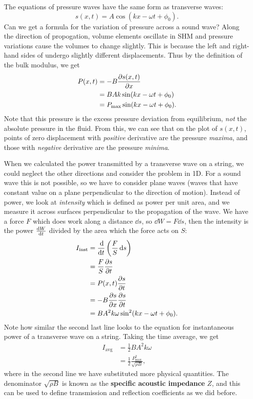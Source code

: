 \documentclass[../classical_mechanics.tex]{subfiles}
\begin{document}
        The equations of pressure waves have the same form as transverse waves:
        \begin{equation}
            s(x,t)=A\cos(kx-\omega t+\phi_0).
        \end{equation}
        Can we get a formula for the variation of pressure across a sound wave?
        Along the direction of propogation, volume elements oscillate in SHM and pressure variations cause the volumes to change slightly.
        This is because the left and right-hand sides of undergo slightly different displacements.
        Thus by the definition of the bulk modulus, we get
        \begin{align}
            P(x,t)&=-B\pdv{s(x,t)}{x}\\
            &=BAk\sin(kx-\omega t+\phi_0)\\
            &=P_\text{max}\sin(kx-\omega t+\phi_0).
        \end{align}
        Note that this pressure is the excess pressure deviation from equilibrium, \textit{not} the absolute pressure in the fluid.
        From this, we can see that on the plot of $s(x,t)$, points of zero displacement with \textit{positive} derivative are the pressure \textit{maxima}, and those with \textit{negative} derivative are the pressure \textit{minima}.

        When we calculated the power transmitted by a transverse wave on a string, we could neglect the other directions and consider the problem in 1D.
        For a sound wave this is not possible, so we have to consider plane waves (waves that have constant value on a plane perpendicular to the direction of motion).
        Instead of power, we look at \textit{intensity} which is defined as power per unit area, and we measure it across surfaces perpendicular to the propagation of the wave.
        We have a force $F$ which does work along a distance $\dd{s}$, so $\dd{W}=F\dd{s}$, then the intensity is the power $\dv{W}{t}$ divided by the area which the force acts on $S$:
        \begin{align}
            I_\text{inst}&=\dv{}{t}\left(\frac{F}{S}\dd{s}\right)\\
            &=\frac{F}{S}\pdv{s}{t}\\
            &=P(x,t)\pdv{s}{t}\\
            &=-B\pdv{s}{x}\pdv{s}{t}\\
            &=BA^2k\omega\sin^2(kx-\omega t+\phi_0).
        \end{align}
        Note how similar the second last line looks to the equation for instantaneous power of a transverse wave on a string.
        Taking the time average, we get
        \begin{align}
            I_\text{avg}&=\frac{1}{2}BA^2k\omega\\
            &=\frac{1}{2}\frac{P_\text{max}^2}{\sqrt{\rho B}},
        \end{align}
        where in the second line we have substituted more physical quantities.
        The denominator $\sqrt{\rho B}$ is known as the \textbf{specific acoustic impedance} $Z$, and this can be used to define transmission and reflection coefficients as we did before.
\end{document}
